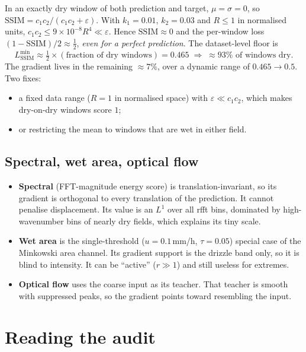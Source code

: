 \documentclass[11pt,a4paper]{article}
\theoremstyle{definition}
\theoremstyle{remark}
\begin{document}
In an exactly dry window of both prediction and target, $\mu=\sigma=0$, so
$\mathrm{SSIM}=c_1c_2/(c_1c_2+\varepsilon)$. With $k_1=0.01$, $k_2=0.03$ and $R\le1$ in
normalised units, $c_1c_2\le9\times10^{-8}R^4\ll\varepsilon$. Hence $\mathrm{SSIM}\approx0$
and the per-window loss $(1-\mathrm{SSIM})/2\approx\tfrac12$, \emph{even for a perfect
prediction}. The dataset-level floor is
\begin{equation}
  L_{\text{SSIM}}^{\min}\approx\tfrac12\times(\text{fraction of dry windows})
  = 0.465 \;\Rightarrow\; \approx93\%\text{ of windows dry}.
\end{equation}
The gradient lives in the remaining $\approx7\%$, over a dynamic range of $0.465\to0.5$. Two
fixes:
\begin{itemize}[nosep]
\item a fixed data range ($R=1$ in normalised space) with $\varepsilon\ll c_1c_2$, which
  makes dry-on-dry windows score $1$;
\item or restricting the mean to windows that are wet in either field.
\end{itemize}

\subsection{Spectral, wet area, optical flow}
\begin{itemize}[nosep]
\item \textbf{Spectral} (FFT-magnitude energy score) is translation-invariant, so its
  gradient is orthogonal to every translation of the prediction. It cannot penalise
  displacement. Its value is an $L^1$ over all rfft bins, dominated by high-wavenumber bins
  of nearly dry fields, which explains its tiny scale.
\item \textbf{Wet area} is the single-threshold ($u=0.1$\,mm/h, $\tau=0.05$) special case of
  the Minkowski area channel. Its gradient support is the drizzle band only, so it is blind
  to intensity. It can be ``active'' ($r\gg1$) and still useless for extremes.
\item \textbf{Optical flow} uses the coarse input as its teacher. That teacher is smooth
  with suppressed peaks, so the gradient points toward resembling the input.
\end{itemize}

\section{Reading the audit}
\end{document}
